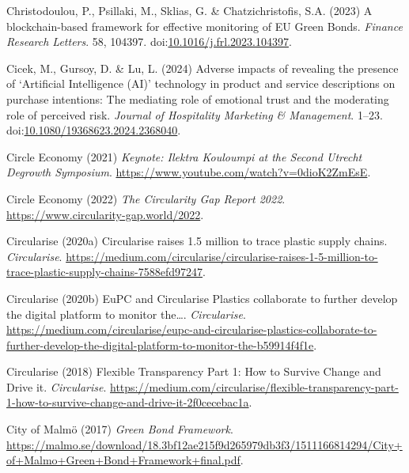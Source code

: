 \documentclass[
  letterpaper,
  DIV=11,
  numbers=noendperiod]{scrartcl}
\newlength{\cslhangindent}
\newenvironment{CSLReferences}[2] %
 {\begin{list}{}{%
  \setlength{\itemindent}{0pt}
  \setlength{\leftmargin}{0pt}
  \setlength{\parsep}{0pt}
  \ifodd #1
   \setlength{\leftmargin}{\cslhangindent}
   \setlength{\itemindent}{-1\cslhangindent}
  \fi
  \setlength{\itemsep}{#2\baselineskip}}}
 {\end{list}}
\begin{document}
\begin{CSLReferences}{0}{1}
Christodoulou, P., Psillaki, M., Sklias, G. \& Chatzichristofis, S.A.
(2023) A blockchain-based framework for effective monitoring of {EU
Green Bonds}. \emph{Finance Research Letters}. 58, 104397.
doi:\href{https://doi.org/10.1016/j.frl.2023.104397}{10.1016/j.frl.2023.104397}.

Cicek, M., Gursoy, D. \& Lu, L. (2024) Adverse impacts of revealing the
presence of {`{Artificial Intelligence} ({AI})'} technology in product
and service descriptions on purchase intentions: The mediating role of
emotional trust and the moderating role of perceived risk. \emph{Journal
of Hospitality Marketing \& Management}. 1--23.
doi:\href{https://doi.org/10.1080/19368623.2024.2368040}{10.1080/19368623.2024.2368040}.

Circle Economy (2021) \emph{Keynote: {Ilektra Kouloumpi} at the {Second
Utrecht Degrowth Symposium}}.
\url{https://www.youtube.com/watch?v=0dioK2ZmEsE}.

Circle Economy (2022) \emph{The {Circularity Gap Report} 2022}.
\url{https://www.circularity-gap.world/2022}.

Circularise (2020a) Circularise raises {\texteuro}1.5 million to trace
plastic supply chains. \emph{Circularise}.
\url{https://medium.com/circularise/circularise-raises-1-5-million-to-trace-plastic-supply-chains-7588efd97247}.

Circularise (2020b) {EuPC} and {Circularise Plastics} collaborate to
further develop the digital platform to monitor the{\ldots{}}.
\emph{Circularise}.
\url{https://medium.com/circularise/eupc-and-circularise-plastics-collaborate-to-further-develop-the-digital-platform-to-monitor-the-b59914f4f1e}.

Circularise (2018) Flexible {Transparency Part} 1: {How} to {Survive
Change} and {Drive} it. \emph{Circularise}.
\url{https://medium.com/circularise/flexible-transparency-part-1-how-to-survive-change-and-drive-it-2f0cecebac1a}.

City of Malmö (2017) \emph{Green {Bond Framework}}.
\url{https://malmo.se/download/18.3bf12ae215f9d265979db3f3/1511166814294/City+of+Malmo+Green+Bond+Framework+final.pdf}.


\end{CSLReferences}
\end{document}
